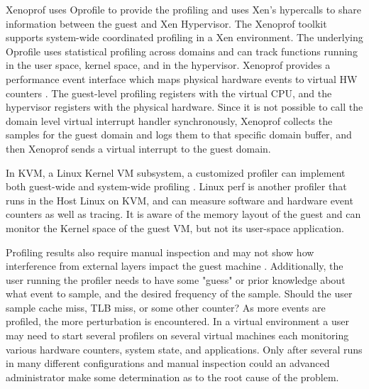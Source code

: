 \indent Xenoprof uses Oprofile to provide the profiling and uses Xen's hypercalls to share information between the guest and Xen Hypervisor.  The Xenoprof toolkit supports system-wide coordinated profiling in a Xen environment.  The underlying Oprofile uses statistical profiling across domains and can track functions running in the user space, kernel space, and in the hypervisor.  Xenoprof provides a performance event interface which maps physical hardware events to virtual HW counters \cite{santos, menon2}.   The guest-level profiling registers with the virtual CPU, and the hypervisor registers with the physical hardware.  Since it is not possible to call the domain level virtual interrupt handler synchronously, Xenoprof collects the samples for the guest domain and logs them to that specific domain buffer, and then Xenoprof sends a virtual interrupt to the guest domain.

\indent In KVM, a Linux Kernel VM subsystem, a customized profiler can implement both guest-wide and system-wide profiling \cite{du2}.  Linux perf is another profiler that runs in the Host Linux on KVM, and can measure software and hardware event counters as well as tracing.  It is aware of the memory layout of the guest and can monitor the Kernel space of the guest VM, but not its user-space application. 

\indent Profiling results also require manual inspection and may not show how interference from external layers impact the guest machine \cite{traeger, knapp1}.  Additionally, the user running the profiler needs to have some "guess" or prior knowledge about what event to sample, and the desired frequency of the sample.  Should the user sample cache miss, TLB miss, or some other counter?  As more events are profiled, the more perturbation is encountered.  In a virtual environment a user may need to start several profilers on several virtual machines each monitoring various hardware counters, system state, and applications.  Only after several runs in many different configurations and manual inspection could an advanced administrator make some determination as to the root cause of the problem. 

